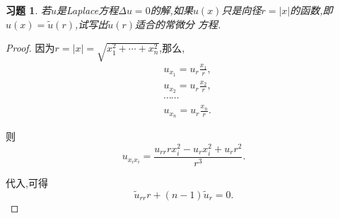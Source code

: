 \documentclass[a4paper,oneside,12pt]{ctexart}
\theoremstyle{plain}
\newtheorem{exercise}{习题}
\theoremstyle{nonumberplain}
\theoremstyle{nonumberplain}
\newtheorem{proof}{证明.}
\newcommand{\abs}[1]{\left\vert#1\right\vert}
\begin{document}
    \begin{exercise}
        \label{ex:1.5}
        若$u$是Laplace方程$\Delta u=0$的解,如果$u(x)$只是向径$r=\abs{x}$的函数,即$u(x)=\tilde{u}(r)$,试写出$\tilde{u}(r)$适合的常微分
        方程.
    \end{exercise}

    \begin{proof}
        因为$r=\abs{x}=\sqrt{x_1^2+\cdots+x_n^2}$,那么, 
        \begin{align*}
            &u_{x_1}=u_r\frac{x_1}{r},\\
            &u_{x_2}=u_r\frac{x_2}{r},\\
            &\cdots\cdots\\
            &u_{x_n}=u_r\frac{x_n}{r}.
        \end{align*}

        则
        \begin{equation*}
            u_{x_ix_i}=\frac{u_{rr}rx_i^2-u_rx_i^2+u_rr^2}{r^3}.
        \end{equation*}

        代入,可得 
        \begin{equation*}
            \tilde{u}_{rr}r+(n-1)\tilde{u}_r=0.
        \end{equation*}
    \end{proof}
\end{document}
